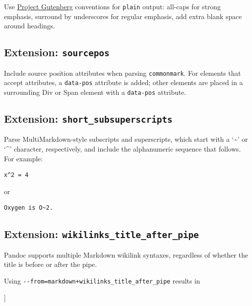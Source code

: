 \documentclass[
  b5paper
]{book}
\newenvironment{Shaded}{}{}
\newcommand{\NormalTok}[1]{#1}
\begin{document}
Use \href{https://www.gutenberg.org}{Project Gutenberg} conventions for
\texttt{plain} output: all-caps for strong emphasis, surround by
underscores for regular emphasis, add extra blank space around headings.

\subsection{\texorpdfstring{Extension:
\texttt{sourcepos}}{Extension: sourcepos}}\label{extension-sourcepos}

Include source position attributes when parsing \texttt{commonmark}. For
elements that accept attributes, a \texttt{data-pos} attribute is added;
other elements are placed in a surrounding Div or Span element with a
\texttt{data-pos} attribute.

\subsection{\texorpdfstring{Extension:
\texttt{short\_subsuperscripts}}{Extension: short\_subsuperscripts}}\label{extension-short_subsuperscripts}

Parse MultiMarkdown-style subscripts and superscripts, which start with
a `\textasciitilde{}' or `\^{}' character, respectively, and include the
alphanumeric sequence that follows. For example:

\begin{verbatim}
x^2 = 4
\end{verbatim}

or

\begin{verbatim}
Oxygen is O~2.
\end{verbatim}

\subsection{\texorpdfstring{Extension:
\texttt{wikilinks\_title\_after\_pipe}}{Extension: wikilinks\_title\_after\_pipe}}\label{extension-wikilinks_title_after_pipe}

Pandoc supports multiple Markdown wikilink syntaxes, regardless of
whether the title is before or after the pipe.

Using \texttt{-\/-from=markdown+wikilinks\_title\_after\_pipe} results
in

\begin{Shaded}
\begin{Highlighting}[]
\NormalTok{[[URL|title]]}
\end{Highlighting}
\end{Shaded}
\end{document}
